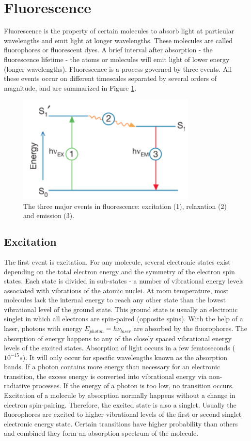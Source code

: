 \documentclass[twoside,single]{lion-msc}
\begin{document}
\section{Fluorescence}
Fluorescence is the property of certain molecules to absorb light at particular wavelengths and emit light at longer wavelengths. These molecules are called fluorophores or fluorescent dyes. A brief interval after absorption - the fluorescence lifetime - the atoms or molecules will emit light of lower energy (longer wavelengths).  Fluorescence is a process governed by three events. All these events occur on different timescales separated by several orders of magnitude, and are summarized in Figure \ref{fluor}.
\begin{figure}[ht!]
\centering
\includegraphics[width=90mm]{fluorescence.jpg}
\caption{The three major events in fluorescence: excitation (1), relaxation (2) and emission (3).} 
\label{fluor}
\end{figure}

\subsection{Excitation}
The first event is excitation. For any molecule, several electronic states exist depending on the total electron energy and the symmetry of the electron spin states. Each state is divided in sub-states - a number of vibrational energy levels associated with vibrations of the atomic nuclei. At room temperature, most molecules lack the internal energy to reach any other state than the lowest vibrational level of the ground state. This ground state is usually an electronic singlet in which all electrons are spin-paired (opposite spins). With the help of a laser, photons with energy $E_{photon}=h \nu_{laser}$ are absorbed by the fluorophores. The absorption of energy happens to any of the closely spaced vibrational energy levels of the excited states. Absorption of light occurs in a few femtoseconds ($10^{-15}s$). It will only occur for specific wavelengths known as the absorption bands. If a photon contains more energy than necessary for an electronic transition, the excess energy is converted into vibrational energy via non-radiative processes. If the energy of a photon is too low, no transition occurs. Excitation of a molecule by absorption normally happens without a change in electron spin-pairing. Therefore, the excited state is also a singlet. Usually the fluorophores are excited to higher vibrational levels of the first or second singlet electronic energy state. Certain transitions have higher probability than others and combined they form an absorption spectrum of the molecule.
\end{document}
